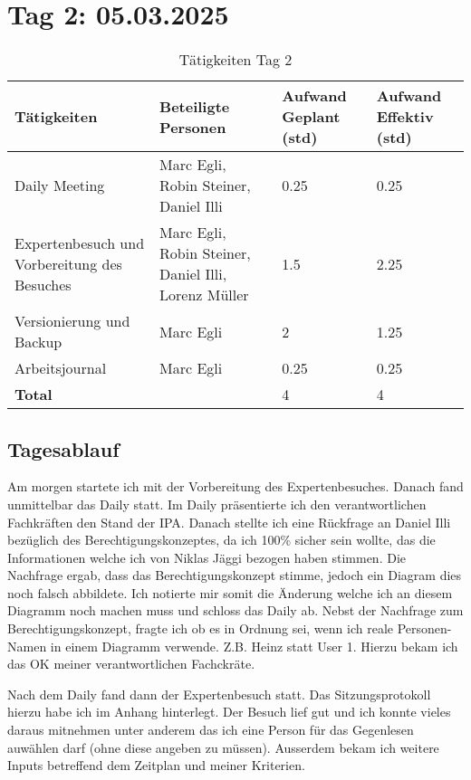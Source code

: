 \section{Tag 2: 05.03.2025}
\begin{table}[H]
    \begin{tabular}{|L{0.4\textwidth}|C{60pt}|C{60pt}|C{60pt}|}
        \hline
        \color{white}Tätigkeiten & \color{white}Beteiligte \color{white}Personen & \color{white}Aufwand Geplant (std) & \color{white}Aufwand Effektiv (std) \\
         \hline
         Daily Meeting & Marc Egli, Robin Steiner, Daniel Illi & 0.25 & 0.25 \\
         \hline
         Expertenbesuch und Vorbereitung des Besuches & Marc Egli, Robin Steiner, Daniel Illi, Lorenz Müller & 1.5 & 2.25 \\
         \hline
         Versionierung und Backup & Marc Egli & 2 & 1.25 \\
         \hline
         Arbeitsjournal & Marc Egli & 0.25 & 0.25 \\
        \hline
        \textbf{Total} &  & 4 & 4 \\
        \hline
    \end{tabular}
    \caption{Tätigkeiten Tag 2}
\end{table}

\subsection*{Tagesablauf}
Am morgen startete ich mit der Vorbereitung des Expertenbesuches. Danach fand unmittelbar das Daily statt.
Im Daily präsentierte ich den verantwortlichen Fachkräften den Stand der IPA. Danach stellte ich eine Rückfrage an Daniel Illi bezüglich des Berechtigungskonzeptes, da
ich 100\% sicher sein wollte, das die Informationen welche ich von Niklas Jäggi bezogen haben stimmen. Die Nachfrage ergab, dass das Berechtigungskonzept stimme, jedoch ein Diagram
dies noch falsch abbildete. Ich notierte mir somit die Änderung welche ich an diesem Diagramm noch machen muss und schloss das Daily ab.
Nebst der Nachfrage zum Berechtigungskonzept, fragte ich ob es in Ordnung sei, wenn ich reale Personen-Namen in einem Diagramm verwende. Z.B. Heinz
statt User 1. Hierzu bekam ich das OK meiner verantwortlichen Fachckräte.

Nach dem Daily fand dann der Expertenbesuch statt. Das Sitzungsprotokoll hierzu habe ich im Anhang hinterlegt. Der Besuch lief gut und ich konnte vieles daraus mitnehmen
unter anderem das ich eine Person für das Gegenlesen auwählen darf (ohne diese angeben zu müssen). Ausserdem bekam ich weitere Inputs betreffend dem Zeitplan und meiner Kriterien.

